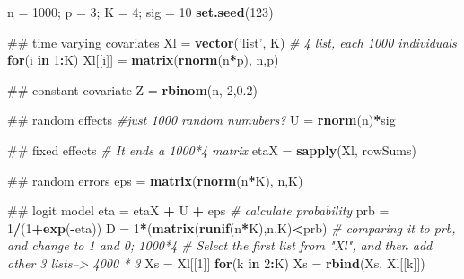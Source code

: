\documentclass[]{book}
\newenvironment{Shaded}{\begin{snugshade}}{\end{snugshade}}
\newcommand{\KeywordTok}[1]{\textcolor[rgb]{0.13,0.29,0.53}{\textbf{#1}}}
\newcommand{\DecValTok}[1]{\textcolor[rgb]{0.00,0.00,0.81}{#1}}
\newcommand{\FloatTok}[1]{\textcolor[rgb]{0.00,0.00,0.81}{#1}}
\newcommand{\StringTok}[1]{\textcolor[rgb]{0.31,0.60,0.02}{#1}}
\newcommand{\CommentTok}[1]{\textcolor[rgb]{0.56,0.35,0.01}{\textit{#1}}}
\newcommand{\ControlFlowTok}[1]{\textcolor[rgb]{0.13,0.29,0.53}{\textbf{#1}}}
\newcommand{\OperatorTok}[1]{\textcolor[rgb]{0.81,0.36,0.00}{\textbf{#1}}}
\newcommand{\NormalTok}[1]{#1}
\begin{document}
\begin{Shaded}
\begin{Highlighting}[]
\NormalTok{n =}\StringTok{ }\DecValTok{1000}\NormalTok{; p =}\StringTok{ }\DecValTok{3}\NormalTok{; K =}\StringTok{ }\DecValTok{4}\NormalTok{; sig =}\StringTok{ }\DecValTok{10}
\KeywordTok{set.seed}\NormalTok{(}\DecValTok{123}\NormalTok{)}

\NormalTok{## time varying covariates}
\NormalTok{Xl =}\StringTok{ }\KeywordTok{vector}\NormalTok{(}\StringTok{'list'}\NormalTok{, K)}
\CommentTok{# 4 list, each 1000 individuals}
\ControlFlowTok{for}\NormalTok{(i }\ControlFlowTok{in} \DecValTok{1}\OperatorTok{:}\NormalTok{K) Xl[[i]] =}\StringTok{ }\KeywordTok{matrix}\NormalTok{(}\KeywordTok{rnorm}\NormalTok{(n}\OperatorTok{*}\NormalTok{p), n,p)}

\NormalTok{## constant covariate}
\NormalTok{Z =}\StringTok{ }\KeywordTok{rbinom}\NormalTok{(n, }\DecValTok{2}\NormalTok{,}\FloatTok{0.2}\NormalTok{)}

\NormalTok{## random effects}
\CommentTok{#just 1000 random numubers?}
\NormalTok{U =}\StringTok{ }\KeywordTok{rnorm}\NormalTok{(n)}\OperatorTok{*}\NormalTok{sig}

\NormalTok{## fixed effects}
\CommentTok{# It ends a 1000*4 matrix}
\NormalTok{etaX =}\StringTok{ }\KeywordTok{sapply}\NormalTok{(Xl, rowSums)}

\NormalTok{## random errors}
\NormalTok{eps =}\StringTok{ }\KeywordTok{matrix}\NormalTok{(}\KeywordTok{rnorm}\NormalTok{(n}\OperatorTok{*}\NormalTok{K), n,K)}

\NormalTok{## logit model}
\NormalTok{eta =}\StringTok{ }\NormalTok{etaX }\OperatorTok{+}\StringTok{ }\NormalTok{U }\OperatorTok{+}\StringTok{ }\NormalTok{eps}
\CommentTok{# calculate probability}
\NormalTok{prb =}\StringTok{ }\DecValTok{1}\OperatorTok{/}\NormalTok{(}\DecValTok{1}\OperatorTok{+}\KeywordTok{exp}\NormalTok{(}\OperatorTok{-}\NormalTok{eta))}
\NormalTok{D =}\StringTok{ }\DecValTok{1}\OperatorTok{*}\NormalTok{(}\KeywordTok{matrix}\NormalTok{(}\KeywordTok{runif}\NormalTok{(n}\OperatorTok{*}\NormalTok{K),n,K)}\OperatorTok{<}\NormalTok{prb) }\CommentTok{# comparing it to prb, and change to 1 and 0; 1000*4}
\CommentTok{# Select the first list from "Xl", and then add other 3 lists--> 4000 * 3}
\NormalTok{Xs =}\StringTok{ }\NormalTok{Xl[[}\DecValTok{1}\NormalTok{]]}
\ControlFlowTok{for}\NormalTok{(k }\ControlFlowTok{in} \DecValTok{2}\OperatorTok{:}\NormalTok{K) Xs =}\StringTok{ }\KeywordTok{rbind}\NormalTok{(Xs, Xl[[k]])}


\end{Highlighting}
\end{Shaded}
\end{document}

